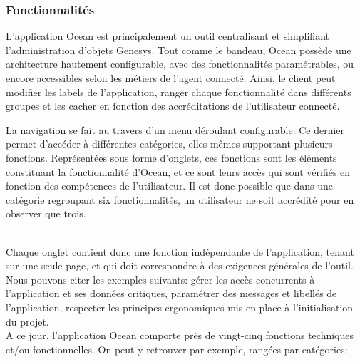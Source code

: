 \documentclass{rapport}
\begin{document}
\subsubsection{Fonctionnalités}

L'application Ocean est principalement un outil centralisant et simplifiant l'administration d'objets Genesys. Tout comme le bandeau, Ocean possède une architecture hautement configurable, avec des fonctionnalités paramétrables, ou encore accessibles selon les métiers de l’agent connecté. Ainsi, le client peut modifier les labels de l'application, ranger chaque fonctionnalité dans différents groupes et les cacher en fonction des accréditations de l'utilisateur connecté.


\begin{minipage}{0.55\textwidth}

La navigation se fait au travers d'un menu déroulant configurable. Ce dernier permet d'accéder à différentes catégories, elles-mêmes supportant plusieurs fonctions. Représentées sous forme d'onglets, ces fonctions sont les éléments constituant la fonctionnalité d'Ocean, et ce sont leurs accès qui sont vérifiés en fonction des compétences de l'utilisateur. Il est donc possible que dans une catégorie regroupant six fonctionnalités, un utilisateur ne soit accrédité pour en observer que trois.

\end{minipage}
\begin{minipage}{0.45\textwidth}
\end{minipage}
\vspace{5mm} %
\noindent
\\

Chaque onglet contient donc une fonction indépendante de l'application, tenant sur une seule page, et qui doit correspondre à des exigences générales de l'outil. Nous pouvons citer les exemples suivants: gérer les accès concurrents à l'application et ses données critiques, paramétrer des messages et libellés de l'application, respecter les principes ergonomiques mis en place à l'initialisation du projet.\\

A ce jour, l'application Ocean comporte près de vingt-cinq fonctions techniques et/ou fonctionnelles. On peut y retrouver par exemple, rangées par catégories:
\end{document}

